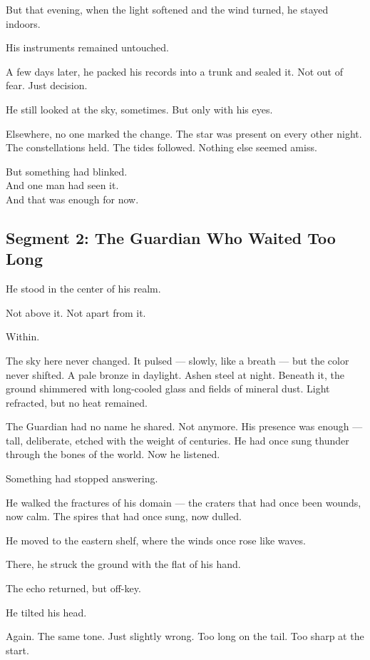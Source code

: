 \documentclass[9pt]{article}
\begin{document}
But that evening, when the light softened and the wind turned, he stayed indoors.

His instruments remained untouched.

A few days later, he packed his records into a trunk and sealed it. Not out of fear. Just decision.

He still looked at the sky, sometimes. But only with his eyes.

Elsewhere, no one marked the change. The star was present on every other night. The constellations held. The tides followed. Nothing else seemed amiss.

But something had blinked.\\
And one man had seen it.\\
And that was enough for now.


\newpage

\subsection*{Segment 2: The Guardian Who Waited Too Long}

He stood in the center of his realm.

Not above it. Not apart from it.

Within.

The sky here never changed. It pulsed — slowly, like a breath — but the color never shifted. A pale bronze in daylight. Ashen steel at night. Beneath it, the ground shimmered with long-cooled glass and fields of mineral dust. Light refracted, but no heat remained.

The Guardian had no name he shared. Not anymore. His presence was enough — tall, deliberate, etched with the weight of centuries. He had once sung thunder through the bones of the world. Now he listened.

Something had stopped answering.

He walked the fractures of his domain — the craters that had once been wounds, now calm. The spires that had once sung, now dulled.

He moved to the eastern shelf, where the winds once rose like waves.

There, he struck the ground with the flat of his hand.

The echo returned, but off-key.

He tilted his head.

Again. The same tone. Just slightly wrong. Too long on the tail. Too sharp at the start.
\end{document}
